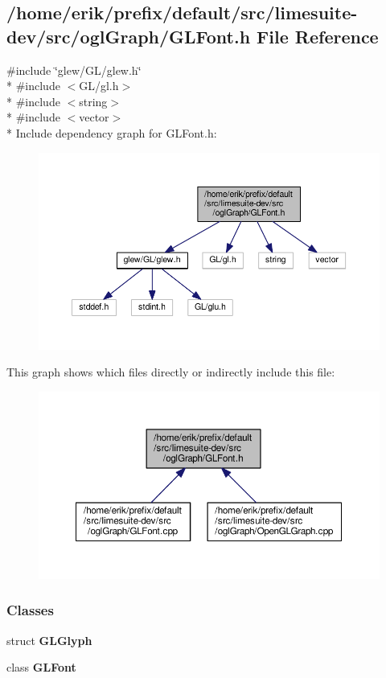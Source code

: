 \subsection{/home/erik/prefix/default/src/limesuite-\/dev/src/ogl\+Graph/\+G\+L\+Font.h File Reference}
\label{GLFont_8h}
{\ttfamily \#include \char`\"{}glew/\+G\+L/glew.\+h\char`\"{}}\\*
{\ttfamily \#include $<$G\+L/gl.\+h$>$}\\*
{\ttfamily \#include $<$string$>$}\\*
{\ttfamily \#include $<$vector$>$}\\*
Include dependency graph for G\+L\+Font.\+h\+:
\nopagebreak
\begin{figure}[H]
\begin{center}
\leavevmode
\includegraphics[width=350pt]{d8/db3/GLFont_8h__incl}
\end{center}
\end{figure}
This graph shows which files directly or indirectly include this file\+:
\nopagebreak
\begin{figure}[H]
\begin{center}
\leavevmode
\includegraphics[width=350pt]{d4/d5c/GLFont_8h__dep__incl}
\end{center}
\end{figure}
\subsubsection*{Classes}
\begin{DoxyCompactItemize}
\item 
struct {\bf G\+L\+Glyph}
\item 
class {\bf G\+L\+Font}
\end{DoxyCompactItemize}
